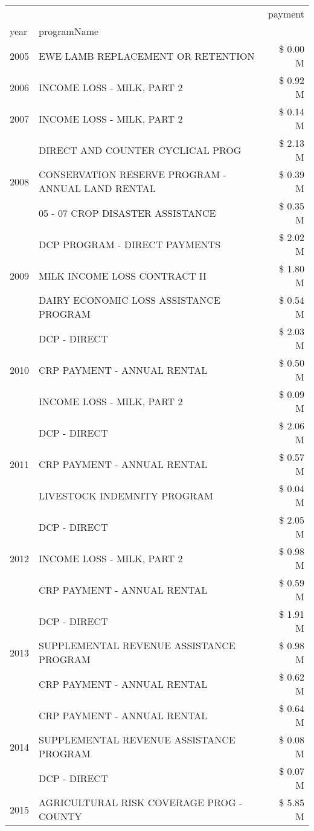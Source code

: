 \begin{tabular}{llr}
\toprule
 &  & payment \\
year & programName &  \\
\midrule
2005 & EWE LAMB REPLACEMENT OR RETENTION & \$ 0.00 M \\
\cline{1-3}
2006 & INCOME LOSS - MILK, PART 2 & \$ 0.92 M \\
\cline{1-3}
2007 & INCOME LOSS - MILK, PART 2 & \$ 0.14 M \\
\cline{1-3}
\multirow[t]{3}{*}{2008} & DIRECT AND COUNTER CYCLICAL PROG & \$ 2.13 M \\
 & CONSERVATION RESERVE PROGRAM - ANNUAL LAND RENTAL & \$ 0.39 M \\
 & 05 - 07 CROP DISASTER ASSISTANCE & \$ 0.35 M \\
\cline{1-3}
\multirow[t]{3}{*}{2009} & DCP PROGRAM - DIRECT PAYMENTS & \$ 2.02 M \\
 & MILK INCOME LOSS CONTRACT II & \$ 1.80 M \\
 & DAIRY ECONOMIC LOSS ASSISTANCE PROGRAM & \$ 0.54 M \\
\cline{1-3}
\multirow[t]{3}{*}{2010} & DCP - DIRECT & \$ 2.03 M \\
 & CRP PAYMENT - ANNUAL RENTAL & \$ 0.50 M \\
 & INCOME LOSS - MILK, PART 2 & \$ 0.09 M \\
\cline{1-3}
\multirow[t]{3}{*}{2011} & DCP - DIRECT & \$ 2.06 M \\
 & CRP PAYMENT - ANNUAL RENTAL & \$ 0.57 M \\
 & LIVESTOCK INDEMNITY PROGRAM & \$ 0.04 M \\
\cline{1-3}
\multirow[t]{3}{*}{2012} & DCP - DIRECT & \$ 2.05 M \\
 & INCOME LOSS - MILK, PART 2 & \$ 0.98 M \\
 & CRP PAYMENT - ANNUAL RENTAL & \$ 0.59 M \\
\cline{1-3}
\multirow[t]{3}{*}{2013} & DCP - DIRECT & \$ 1.91 M \\
 & SUPPLEMENTAL REVENUE ASSISTANCE PROGRAM & \$ 0.98 M \\
 & CRP PAYMENT - ANNUAL RENTAL & \$ 0.62 M \\
\cline{1-3}
\multirow[t]{3}{*}{2014} & CRP PAYMENT - ANNUAL RENTAL & \$ 0.64 M \\
 & SUPPLEMENTAL REVENUE ASSISTANCE PROGRAM & \$ 0.08 M \\
 & DCP - DIRECT & \$ 0.07 M \\
\cline{1-3}
\multirow[t]{3}{*}{2015} & AGRICULTURAL RISK COVERAGE PROG - COUNTY & \$ 5.85 M \\

\end{tabular}
